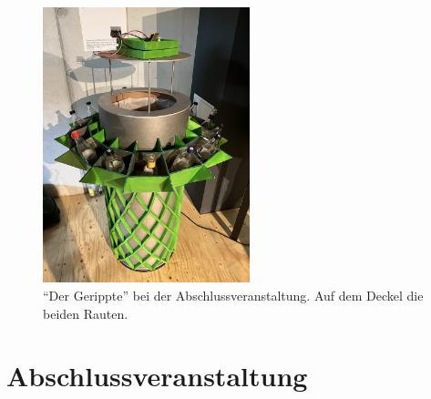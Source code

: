    \begin{figure}[H]
        \begin{center}
            \includegraphics[width=6cm]{media/04_result/pic_bin.jpg}
        \end{center}
        \caption{\enquote{Der Gerippte} bei der Abschlussveranstaltung. Auf dem Deckel die beiden Rauten.}
        \label{fig:pic_gerippte_1}
    \end{figure}

\section{Abschlussveranstaltung}

